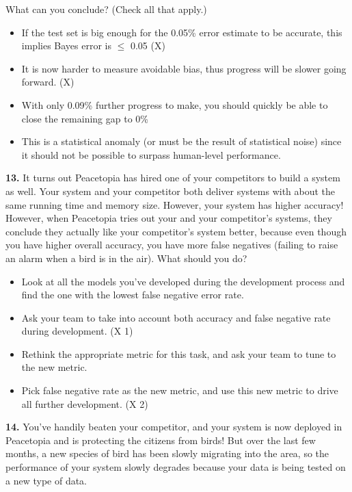 What can you conclude? (Check all that apply.)
\begin{itemize}
    \item If the test set is big enough for the 0.05\% error estimate to be accurate, this implies Bayes error is $\leq$ 0.05 (X)
    \item It is now harder to measure avoidable bias, thus progress will be slower going forward. (X)
    \item With only 0.09\% further progress to make, you should quickly be able to close the remaining gap to 0\%
    \item This is a statistical anomaly (or must be the result of statistical noise) since it should not be possible to surpass human-level performance.
\end{itemize}
\textbf{13.} It turns out Peacetopia has hired one of your competitors to build a system as well. Your system and your competitor both deliver systems with about the same running time and memory size. However, your system has higher accuracy! However, when Peacetopia tries out your and your competitor’s systems, they conclude they actually like your competitor’s system better, because even though you have higher overall accuracy, you have more false negatives (failing to raise an alarm when a bird is in the air). What should you do?
\begin{itemize}
    \item Look at all the models you’ve developed during the development process and find the one with the lowest false negative error rate.
    \item Ask your team to take into account both accuracy and false negative rate during development. (X 1)
    \item Rethink the appropriate metric for this task, and ask your team to tune to the new metric.
    \item Pick false negative rate as the new metric, and use this new metric to drive all further development. (X 2)
\end{itemize}
\textbf{14.} You’ve handily beaten your competitor, and your system is now deployed in Peacetopia and is protecting the citizens from birds! But over the last few months, a new species of bird has been slowly migrating into the area, so the performance of your system slowly degrades because your data is being tested on a new type of data.


